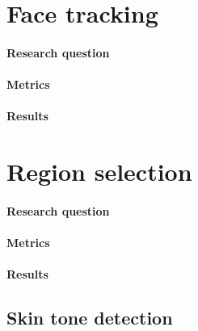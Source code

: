 \section{Face tracking}
\label{section:face_tracking}
\paragraph{Research question}
\paragraph{Metrics}
\paragraph{Results}


\section{Region selection}
\label{section:region_selection}
\paragraph{Research question}
\paragraph{Metrics}
\paragraph{Results}

\subsection{Skin tone detection}
\label{section:skin_tone_detection}
